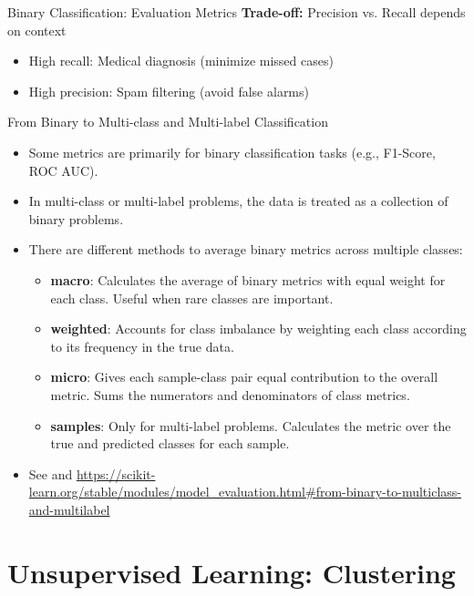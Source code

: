 \documentclass[11pt]{beamer}
\begin{document}
\begin{frame}{Binary Classification: Evaluation Metrics}
    \vspace{0.1cm}
    \textbf{Trade-off:} Precision vs. Recall depends on context
    \begin{itemize}
        \small
        \item High recall: Medical diagnosis (minimize missed cases)
        \item High precision: Spam filtering (avoid false alarms)
    \end{itemize}
\end{frame}


\begin{frame}{From Binary to Multi-class and Multi-label Classification}
    \begin{itemize}
        \item Some metrics are primarily for binary classification tasks (e.g., F1-Score, ROC AUC).
        \item In multi-class or multi-label problems, the data is treated as a collection of binary problems.
        \item There are different methods to average binary metrics across multiple classes:
        \begin{itemize}
            \item \textbf{macro}: Calculates the average of binary metrics with equal weight for each class. Useful when rare classes are important.
            \item \textbf{weighted}: Accounts for class imbalance by weighting each class according to its frequency in the true data.
            \item \textbf{micro}: Gives each sample-class pair equal contribution to the overall metric. Sums the numerators and denominators of class metrics.
            \item \textbf{samples}: Only for multi-label problems. Calculates the metric over the true and predicted classes for each sample.
        \end{itemize}
		\item See \citet[pp. 197]{raschka2019PythonMachineLearning} and \url{https://scikit-learn.org/stable/modules/model_evaluation.html\#from-binary-to-multiclass-and-multilabel}
    \end{itemize}
\end{frame}


\section{Unsupervised Learning: Clustering}
\end{document}
